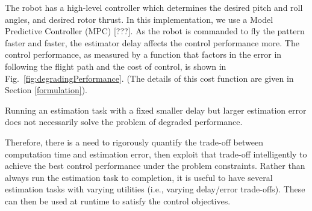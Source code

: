 The robot has a high-level controller which determines the desired pitch and roll angles, and desired rotor thrust. 
In this implementation, we use a Model Predictive Controller (MPC) [???].
As the robot is commanded to fly the pattern faster and faster, the estimator delay affects the control performance more.
The control performance, as measured by a function that factors in the error in following the flight path and the cost of control, is shown in Fig.~\ref{fig:degradingPerformance}.
(The details of this cost function are given in Section \ref{formulation}).

Running an estimation task with a fixed smaller delay but larger estimation error does not necessarily solve the problem of degraded performance.

Therefore, there is a need to rigorously quantify the trade-off between computation time and estimation error, then exploit that trade-off intelligently to achieve the best control performance under the problem constraints.
Rather than always run the estimation task to completion, it is useful to have several estimation tasks with varying utilities (i.e., varying delay/error trade-offs).
These can then be used at runtime to satisfy the control objectives.
